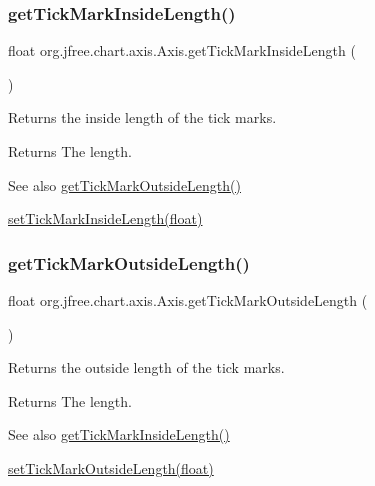 \subsubsection{\texorpdfstring{get\+Tick\+Mark\+Inside\+Length()}{getTickMarkInsideLength()}}
{\footnotesize\ttfamily float org.\+jfree.\+chart.\+axis.\+Axis.\+get\+Tick\+Mark\+Inside\+Length (\begin{DoxyParamCaption}{ }\end{DoxyParamCaption})}

Returns the inside length of the tick marks.

\begin{DoxyReturn}{Returns}
The length.
\end{DoxyReturn}
\begin{DoxySeeAlso}{See also}
\mbox{\hyperlink{classorg_1_1jfree_1_1chart_1_1axis_1_1_axis_aa25be81d8bfbbdd2c6e123948f953ec8}{get\+Tick\+Mark\+Outside\+Length()}} 

\mbox{\hyperlink{classorg_1_1jfree_1_1chart_1_1axis_1_1_axis_a2668a7d63e7a82ca62f94dc27fbc3a80}{set\+Tick\+Mark\+Inside\+Length(float)}} 
\end{DoxySeeAlso}
\mbox{\label{classorg_1_1jfree_1_1chart_1_1axis_1_1_axis_aa25be81d8bfbbdd2c6e123948f953ec8}} 
\subsubsection{\texorpdfstring{get\+Tick\+Mark\+Outside\+Length()}{getTickMarkOutsideLength()}}
{\footnotesize\ttfamily float org.\+jfree.\+chart.\+axis.\+Axis.\+get\+Tick\+Mark\+Outside\+Length (\begin{DoxyParamCaption}{ }\end{DoxyParamCaption})}

Returns the outside length of the tick marks.

\begin{DoxyReturn}{Returns}
The length.
\end{DoxyReturn}
\begin{DoxySeeAlso}{See also}
\mbox{\hyperlink{classorg_1_1jfree_1_1chart_1_1axis_1_1_axis_a6148f15b99e9ba54ac3a3793e16e3110}{get\+Tick\+Mark\+Inside\+Length()}} 

\mbox{\hyperlink{classorg_1_1jfree_1_1chart_1_1axis_1_1_axis_a6a52712e5ddf81c046eac2f1b4894576}{set\+Tick\+Mark\+Outside\+Length(float)}} 
\end{DoxySeeAlso}
\mbox{\label{classorg_1_1jfree_1_1chart_1_1axis_1_1_axis_a705a68f5e9e714df67c98dd2b24337e8}} 
